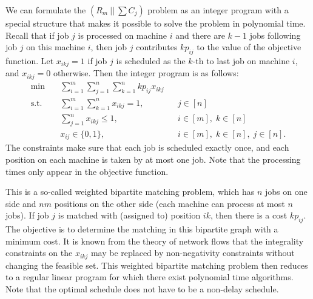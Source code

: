 We can formulate the $(R_m~||~\sum C_j)$ problem as an integer program 
with a special structure that makes it possible to solve the problem in 
polynomial time. Recall that if job $j$ is processed on machine $i$ 
and there are $k-1$ jobs following job $j$ on this machine $i$, then 
job $j$ contributes $kp_{ij}$ to the value of the objective function. 
Let $x_{ikj} = 1$ if job $j$ is scheduled as the $k$-th to last job 
on machine $i$, and $x_{ikj} = 0$ otherwise. Then the integer 
program is as follows: 
\begin{align*}
    \min\quad & \sum_{i=1}^m \sum_{j=1}^n \sum_{k=1}^n kp_{ij} x_{ikj} \\ 
    \text{s.t.}\quad & \sum_{i=1}^m \sum_{k=1}^n x_{ikj} = 1, && j \in [n] \\ 
    & \sum_{j=1}^n x_{ikj} \leq 1, && i \in [m],\; k \in [n] \\ 
    & x_{ij} \in \{0, 1\}, && i \in [m],\; k \in [n],\; j \in [n]. 
\end{align*}
The constraints make sure that each job is scheduled exactly once, and each
position on each machine is taken by at most one job. Note that the processing
times only appear in the objective function.

This is a so-called weighted bipartite matching problem, which has 
$n$ jobs on one side and $nm$ positions on the other side (each machine can 
process at most $n$ jobs). If job $j$ is matched with (assigned to) 
position $ik$, then there is a cost $kp_{ij}$. The objective is to 
determine the matching in this bipartite graph with a minimum cost. 
It is known from the theory of network flows that the integrality constraints 
on the $x_{ikj}$ may be replaced by non-negativity constraints
without changing the feasible set.  This weighted bipartite matching problem
then reduces to a regular linear program for which there exist polynomial time
algorithms. Note that the optimal schedule does not have to be a non-delay schedule.